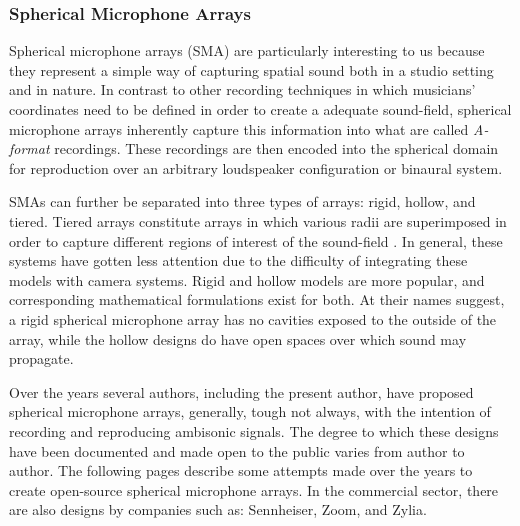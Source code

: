 
\subsubsection{Spherical Microphone Arrays}

Spherical microphone arrays (SMA) are particularly interesting to us because they represent a simple way of capturing spatial sound both in a studio setting and in nature. In contrast to other recording techniques in which musicians' coordinates need to be defined in order to create a adequate sound-field, spherical microphone arrays inherently capture this information into what are called \textit{A-format} recordings. These recordings are then encoded into the spherical domain for reproduction over an arbitrary loudspeaker configuration or binaural system. 

SMAs can further be separated into three types of arrays: rigid, hollow, and tiered. Tiered arrays constitute arrays in which various radii are superimposed in order to capture different regions of interest of the sound-field \cite{dabin2015design}. In general, these systems have gotten less attention due to the difficulty of integrating these models with camera systems. Rigid and hollow models are more popular, and corresponding mathematical formulations exist for both. At their names suggest, a rigid spherical microphone array has no cavities exposed to the outside of the array, while the hollow designs do have open spaces over which sound may propagate.


Over the years several authors, including the present author, have proposed spherical microphone arrays, generally, tough not always, with the intention of recording and reproducing ambisonic signals. The degree to which these designs have been documented and made open to the public varies from author to author. The following pages describe some attempts made over the years to create open-source spherical microphone arrays. In the commercial sector, there are also designs by companies such as: Sennheiser, Zoom, and Zylia. 

